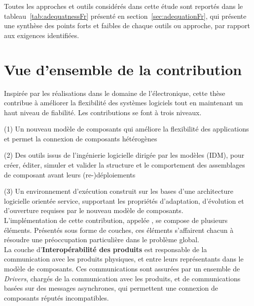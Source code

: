 Toutes les approches et outils considérés dans cette étude sont reportés dans le tableau~\ref{tab:adequatnessFr} présenté en section~\ref{sec:adequationFr}, qui présente une synthèse des points forts et faibles de chaque outils ou approche, par rapport aux exigences identifiées.


\section{Vue d'ensemble de la contribution}

Inspirée par les réalisations dans le domaine de l'électronique, cette thèse contribue à améliorer la flexibilité des systèmes logiciels tout en maintenant un haut niveau de fiabilité. Les contributions se font à trois niveaux.

\par (1) Un nouveau modèle de composants qui améliore la flexibilité des applications et permet la connexion de composants hétérogènes
\par (2) Des outils issus de l'ingénierie logicielle dirigée par les modèles (IDM), pour créer, éditer, simuler et valider la structure et le comportement des assemblages de composant avant leurs (re-)déploiements
\par (3) Un environnement d'exécution construit sur les bases d'une architecture logicielle orientée service, supportant les propriétés d'adaptation, d'évolution et d'ouverture requises par le nouveau modèle de composants.\\

L'implémentation de cette contribution, appelée \enti{}, se compose de plusieurs éléments. Présentés sous forme de couches, ces éléments s'affairent chacun à résoudre une préoccupation particulière dans le problème global.\\

La couche d'{\bf Interopérabilité des produits} est responsable de la communication avec les produits physiques, et entre leurs représentants dans le modèle de composants. Ces communications sont assurées par un ensemble de {\it Drivers}, chargés de la communication avec les produits, et de communications basées sur des messages asynchrones, qui permettent une connexion de composants réputés incompatibles.\\


